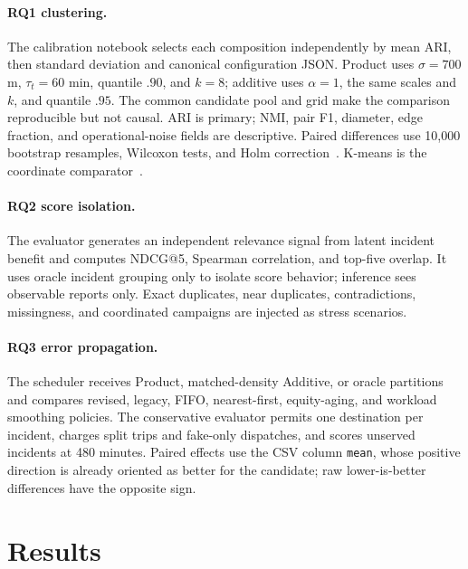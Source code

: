 \documentclass[runningheads]{llncs}
\begin{document}
\paragraph{RQ1 clustering.}
The calibration notebook selects each composition independently by mean ARI,
then standard deviation and canonical configuration JSON. Product uses
$\sigma=700$ m, $\tau_t=60$ min, quantile $.90$, and $k=8$; additive uses
$\alpha=1$, the same scales and $k$, and quantile $.95$. The common candidate
pool and grid make the comparison reproducible but not causal. ARI is primary;
NMI, pair F1, diameter, edge fraction, and operational-noise fields are
descriptive. Paired differences use 10,000 bootstrap resamples, Wilcoxon
tests, and Holm correction~\cite{hubert1985comparing}. K-means is the
coordinate comparator~\cite{macqueen1967some}.

\paragraph{RQ2 score isolation.}
The evaluator generates an independent relevance signal from latent incident
benefit and computes NDCG@5, Spearman correlation, and top-five overlap. It
uses oracle incident grouping only to isolate score behavior; inference sees
observable reports only. Exact duplicates, near duplicates, contradictions,
missingness, and coordinated campaigns are injected as stress scenarios.

\paragraph{RQ3 error propagation.}
The scheduler receives Product, matched-density Additive, or oracle partitions
and compares revised, legacy, FIFO, nearest-first, equity-aging, and workload
smoothing policies. The conservative evaluator permits one destination per
incident, charges split trips and fake-only dispatches, and scores unserved
incidents at 480 minutes. Paired effects use the CSV column \texttt{mean}, whose
positive direction is already oriented as better for the candidate; raw
lower-is-better differences have the opposite sign.

\section{Results}
\end{document}
